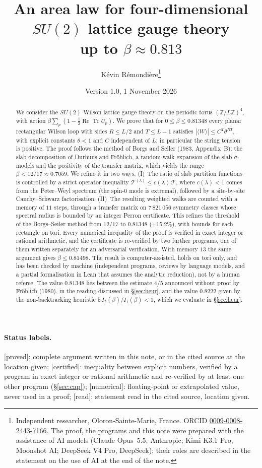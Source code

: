 \documentclass[11pt,a4paper]{article}
\title{An area law for four-dimensional $SU(2)$ lattice gauge theory\\ up to $\beta\approx0.813$}
\author{K\'evin R\'emondi\`ere\thanks{Independent researcher, Oloron-Sainte-Marie, France. ORCID
\href{https://orcid.org/0009-0008-2443-7166}{0009-0008-2443-7166}. The proof, the programs and this note were prepared with
the assistance of AI models (Claude Opus~5.5, Anthropic; Kimi K3.1 Pro, Moonshot AI; DeepSeek V4 Pro, DeepSeek); their roles are
described in the statement on the use of AI at the end of the note.}}
\date{Version 1.0, 1 November 2026}
\theoremstyle{plain}
\theoremstyle{remark}
\numberwithin{equation}{section}
\newcommand{\Z}{\mathbb{Z}}
\newcommand{\ReTr}{\operatorname{Re}\operatorname{Tr}}
\newcommand{\cT}{\mathcal{T}}
\newcommand{\st}[1]{\textsf{[#1]}}
\begin{document}
\maketitle

\begin{abstract}
We consider the $SU(2)$ Wilson lattice gauge theory on the periodic torus $(\Z/L\Z)^4$, with action
$\beta\sum_p(1-\tfrac12\ReTr U_p)$. We prove that for $0\le\beta\le0.81348$ every planar rectangular Wilson loop with sides
$R\le L/2$ and $T\le L-1$ satisfies $|\langle W\rangle|\le C^T\theta^{RT}$, with explicit constants $\theta<1$ and $C$ independent
of $L$; in particular the string tension is positive. The proof follows the method of Borgs and Seiler (1983, Appendix~B): the slab
decomposition of Durhuus and Fr\"ohlich, a random-walk expansion of the slab $\sigma$-models and the positivity of the transfer
matrix, which yields the range $\beta<12/17\approx0.7059$. We refine it in two ways. (I)~The ratio of slab partition
functions is controlled by a strict operator inequality $\cT^{(\lambda)}\le c(\lambda)\,\cT$, where $c(\lambda)<1$ comes from the
Peter--Weyl spectrum (the spin-$0$ mode is extremal), followed by a site-by-site Cauchy--Schwarz factorisation. (II)~The resulting
weighted walks are counted with a memory of $11$ steps, through a transfer matrix on $7\,821\,056$ symmetry classes whose spectral
radius is bounded by an integer Perron certificate. This refines the threshold of the Borgs--Seiler method from $12/17$ to
$0.81348$ ($+15.2\%$), with bounds for each rectangle on tori. Every numerical inequality of the proof is verified in exact integer or rational
arithmetic, and the certificate is re-verified by two further programs, one of them written separately for an adversarial
verification. With memory $13$ the same argument gives
$\beta\le0.81498$. The result is computer-assisted, holds on tori only, and has been checked by machine (independent programs,
reviews by language models, and a partial formalisation in Lean that assumes the analytic reduction), not by a human referee. The value $0.81348$ lies between the estimate $4/5$ announced without proof by
Fr\"ohlich (1980), in the reading discussed in \S\ref{sec:heur}, and the value $0.8222$ given by the non-backtracking heuristic
$5\,I_2(\beta)/I_1(\beta)<1$, which we evaluate in \S\ref{sec:heur}.
\end{abstract}

\paragraph{Status labels.}
\st{proved}: complete argument written in this note, or in the cited source at the location given;
\st{certified}: inequality between explicit numbers, verified by a program in exact integer or rational arithmetic and re-verified by
at least one other program (\S\ref{sec:cap});
\st{numerical}: floating-point or extrapolated value, never used in a proof;
\st{read}: statement read in the cited source, location given.
\end{document}
